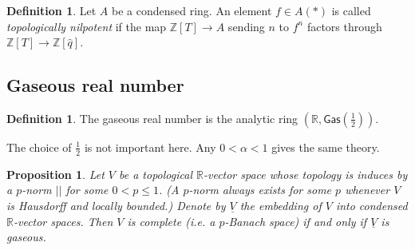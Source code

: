 \documentclass{article}
\theoremstyle{plain}
\newtheorem{prop}[thm]{Proposition}
\theoremstyle{definition}
\newtheorem{defi}[thm]{Definition}
\theoremstyle{remark}
\begin{document}
\begin{defi}
Let $ A $ be a condensed ring. An element $ f \in  A (*) $ is called \emph{topologically nilpotent}
if the map $ \mathbb{Z}[T]\to A $ sending $ n $ to $ f ^{n} $ factors through $ \mathbb{Z}[T]\to \mathbb{Z}[\hat{q}]$.
\end{defi}

\subsection{Gaseous real number}

\begin{defi}
The gaseous real number is the analytic ring $ (\mathbb{R}, \mathsf{Gas}(\frac{1}{2})) $.
\end{defi}

The choice of $ \frac{1}{2} $ is not important here. Any $ 0<\alpha <1 $ gives the same theory.

\begin{prop}
Let $ V $ be a topological $ \mathbb{R} $-vector space whose topology is induces by a $ p $-norm $ || $ for some $ 0<p\leq 1 $.
(A $ p $-norm always exists for some $ p $ whenever $ V $ is Hausdorff and locally bounded.)
Denote by $ \underline{V} $ the embedding of $ V $ into condensed $ \mathbb{R} $-vector spaces.
Then $ V $ is complete (i.e. a $ p $-Banach space) if and only if $ \underline{V} $ is gaseous.
\end{prop}
\end{document}
